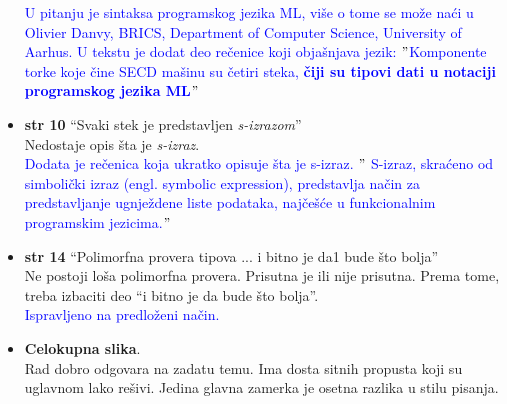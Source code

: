 \documentclass[a4paper]{report}
\newcommand{\odgovor}[1]{\textcolor{blue}{#1}}
\begin{document}
\begin{itemize}
\odgovor{U pitanju je sintaksa programskog jezika ML, više o tome se može naći u Olivier Danvy, BRICS, Department of Computer Science, University of Aarhus. U tekstu je dodat deo rečenice koji objašnjava jezik: $"$Komponente torke koje čine SECD mašinu su četiri steka, \textbf{čiji su tipovi dati u notaciji programskog jezika ML$"$}}

\item \textbf{str 10} ``Svaki stek je predstavljen \textit{s-izrazom}'' \\ Nedostaje opis šta je \textit{s-izraz}.\\

\odgovor{Dodata je rečenica koja ukratko opisuje šta je s-izraz. $"$ S-izraz, skraćeno od simbolički izraz (engl. symbolic expression), predstavlja način za predstavljanje ugnježdene liste podataka, najčešće u funkcionalnim programskim jezicima.$"$}

\item \textbf{str 14} ``Polimorfna provera tipova ... i bitno je da1 bude što bolja'' \\ Ne postoji loša polimorfna provera. Prisutna je ili nije prisutna. Prema tome, treba izbaciti deo ``i bitno je da bude što bolja''.\\

\odgovor{Ispravljeno na predloženi način.}

\item \textbf{Celokupna slika}. \\Rad dobro odgovara na zadatu temu. Ima dosta sitnih propusta koji su uglavnom lako rešivi. Jedina glavna zamerka je osetna razlika u stilu pisanja.
\end{itemize}
\end{document}
